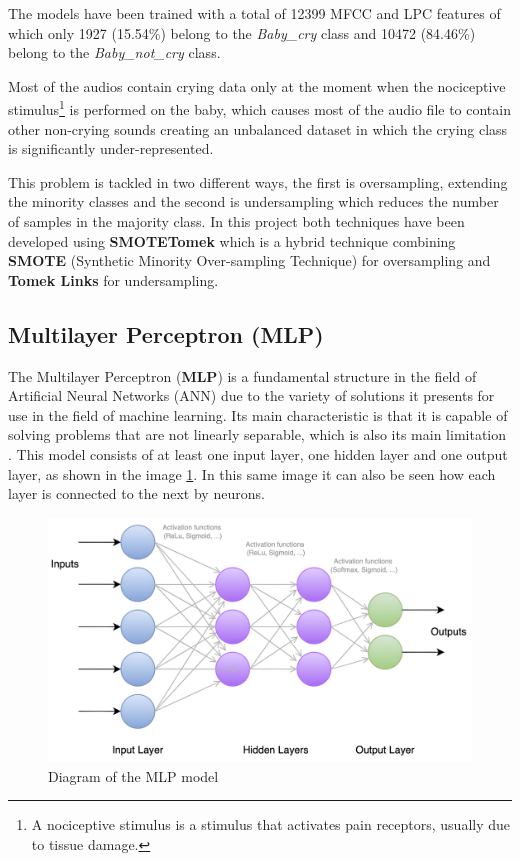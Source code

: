 \begin{tcolorbox}
The models have been trained with a total of 12399 MFCC and LPC features of which only 1927 (15.54\%) belong to the \textit{Baby\_cry} class and 10472 (84.46\%) belong to the \textit{Baby\_not\_cry} class.
\end{tcolorbox}

Most of the audios contain crying data only at the moment when the nociceptive stimulus\footnote{A nociceptive stimulus is a stimulus that activates pain receptors, usually due to tissue damage.} is performed on the baby, which causes most of the audio file to contain other non-crying sounds creating an unbalanced dataset in which the crying class is significantly under-represented. 


This problem is tackled in two different ways, the first is oversampling, extending the minority classes and the second is undersampling which reduces the number of samples in the majority class. In this project both techniques have been developed using \textbf{SMOTETomek} which is a hybrid technique combining \textbf{SMOTE} (Synthetic Minority Over-sampling Technique) for oversampling and \textbf{Tomek Links} for undersampling.


\subsection{Multilayer Perceptron (MLP)}
The Multilayer Perceptron (\textbf{MLP}) is a fundamental structure in the field of Artificial Neural Networks (ANN) due to the variety of solutions it presents for use in the field of machine learning. Its main characteristic is that it is capable of solving problems that are not linearly separable, which is also its main limitation \cite{Mercado2015}. This model consists of at least one input layer, one hidden layer and one output layer, as shown in the image \ref{fig:MLP-model}. In this same image it can also be seen how each layer is connected to the next by neurons.
\vspace{\baselineskip}

\begin{figure}[h]
\centering
    \includegraphics[width=1\textwidth]{figures/MLP-model.png}
\caption{Diagram of the MLP model}
\label{fig:MLP-model}
\end{figure}

